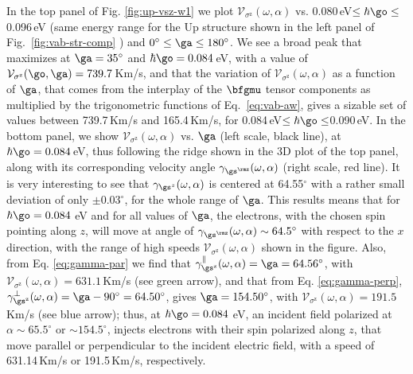 \documentclass[prb,11pt,tightenlines,twocolumn,aps]{revtex4-1}
\begin{document}
In the top panel of Fig. \ref{fig:up-vsz-w1} we plot
$\mathcal{V}_{\sigma^{\mathrm{z}}} (\omega,\alpha)$ vs.
0.080\,eV$\leq\hbar\go\leq$0.096\,eV {\color{red}(same energy range for the Up
structure shown in the left panel of Fig.~\ref{fig:vab-str-comp} )} and
$0^\circ\leq\ga\leq 180^\circ$.
% 
We see a broad peak that maximizes at $\ga=35^{\circ}$ and $\hbar\go=
0.084$\,eV, with a value of $\mathcal{V}_{\sigma^{\mathrm{z}}}(\go,\ga) =
739.7$\,Km/s, and that the variation of $\mathcal{V}_{\sigma^{\mathrm{z}}}
(\omega,\alpha)$ as a function of $\ga$, that comes from the interplay of the
$\bfgmu$ tensor components as multiplied by the  trigonometric functions of
Eq.~\eqref{eq:vab-aw}, gives a sizable set of values between 739.7\,Km/s and
165.4\,Km/s, for 0.084\,eV$\leq\hbar\go\leq$0.090\,eV. 
% 
In the bottom panel, we show $\mathcal{V}_{\sigma^{\mathrm{z}}}
(\omega,\alpha)$ vs. $\ga$ (left scale, black line), at $\hbar\go= 0.084$\,eV,
{\color{red}thus following the ridge shown in the 3D plot of the top panel,
along with its corresponding velocity angle $\gamma_{\gs^\rmz}(\omega,\alpha)$
(right scale, red line)}.
% 
It is very interesting to see that $\gamma_{\gs^z}(\omega,\alpha)$ is centered
at 64.55$^\circ$ with a rather small deviation of only $\pm 0.03^\circ$,
for the whole range of $\ga$. This results means that for $\hbar\go=0.084$ eV
and for all values of $\ga$, the electrons, with the chosen spin pointing along
$z$, will move at angle of {\color{red}$\gamma_{\gs^\rmz}(\omega,\alpha) \sim
64.5^{\circ}$} with respect to the $x$ direction, with the range of  high
speeds $\mathcal{V}_{\sigma^{\mathrm{z}}} (\omega,\alpha)$ shown in the figure.
% 
Also, from Eq. \eqref{eq:gamma-par} we find that
$\gamma^\parallel_{\gs^\mathrm{z}} (\omega,\alpha)=\ga = 64.56^\circ$, with
$\mathcal{V}_{\sigma^{\mathrm{z}}} (\omega,\alpha) = 631.1$\,Km/s (see green
arrow), and that from Eq. \eqref{eq:gamma-perp},
$\gamma^\perp_{\gs^\mathrm{z}}(\omega,\alpha)=\ga-90^\circ=64.50^\circ$,
gives $\ga=154.50^\circ$, with
$\mathcal{V}_{\sigma^{\mathrm{z}}}(\omega,\alpha) = 191.5$ Km/s (see blue
arrow); thus, at $\hbar\go=0.084$ eV, an incident field polarized at $\alpha
\sim 65.5^\circ$ or $\sim 154.5^\circ$, injects electrons with their spin
polarized along $z$, that move parallel or perpendicular to the incident
electric field,  with a speed of 631.14\,Km/s or 191.5\,Km/s, respectively.
\end{document}
